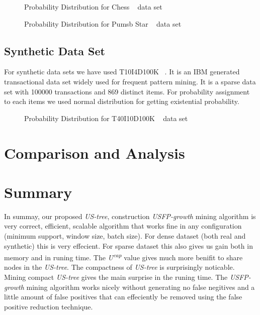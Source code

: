 		\begin{figure}[h]
		\centering
			
		\caption{Probability Distribution for Chess ~\cite{dataset} data set}
		\label{result:g_dataset_chess}
		\end{figure}
		
		\begin{figure}[h]
		\centering
			
		\caption{Probability Distribution for Pumsb Star ~\cite{dataset} data set}
		\label{result:g_dataset_pumsb_star}
		\end{figure}

\subsection{Synthetic Data Set}
For synthetic data sets we have used T10I4D100K ~\cite{dataset}. It is an IBM generated transactional data set widely used for frequent pattern mining. It is a sparse data set with 100000 transactions and 869 distinct items. For probability assignment to each items we used normal distribution for getting existential probability.
		\begin{figure}[h]
		\centering
			
		\caption{Probability Distribution for T40I10D100K ~\cite{dataset} data set}
		\label{result:g_dataset_t10}
		\end{figure}
		
		
\clearpage
\section{Comparison and Analysis}
	

\clearpage
\section{Summary}
In summay, our proposed \emph{US-tree}, construction \emph{USFP-growth} mining algorithm is very correct, efficient, scalable algorithm that works fine in any configuration (minimum support, window size, batch size). For dense dataset (both real and synthetic) this is very effecient. For sparse dataset this also gives us gain both in memory and in runing time. The \emph{U\textsuperscript{cap}} value gives much more benifit to share nodes in the \emph{US-tree}. The compactness of \emph{US-tree} is surprisingly noticable. Mining compact \emph{US-tree} gives the main surprise in the runing time. The \emph{USFP-growth} mining algorithm works nicely without generating no false negitives and a little amount of false positives that can effeciently be removed using the false positive reduction technique.
%
%